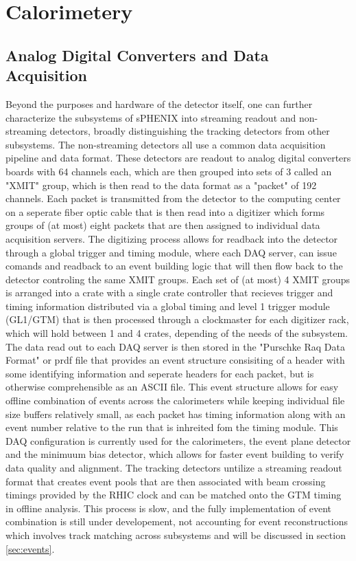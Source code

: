 \documentclass[letterpaper, 12pt, oneside]{book}
\theoremstyle{definition}
\begin{document}
\section{Calorimetery}
	\subsection{Analog Digital Converters and Data Acquisition}
		Beyond the purposes and hardware of the detector itself, one can further characterize the subsystems of sPHENIX into streaming readout and non-streaming detectors, broadly distinguishing the tracking detectors from other subsystems. 
		The non-streaming detectors all use a common data acquisition pipeline and data format. 
		These detectors are readout to analog digital converters boards with 64 channels each, which are then grouped into sets of 3 called an "XMIT" group, which is then read to the data format as a "packet" of 192 channels. 
		Each packet is transmitted from the detector to the computing center on a seperate fiber optic cable that is then read into a digitizer which forms groups of (at most) eight packets that are then assigned to individual data acquisition servers. 
		The digitizing process allows for readback into the detector through a global trigger and timing module, where each DAQ server, can issue comands and readback to an event building logic that will then flow back to the detector controling the same XMIT groups. 
		Each set of (at most) 4 XMIT groups is arranged into a crate with a single crate controller that recieves trigger and timing information distributed via a global timing and level 1 trigger module (GL1/GTM) that is then processed through a clockmaster for each digitizer rack, which will hold between 1 and 4 crates, depending of the needs of the subsystem. 
		The data read out to each DAQ server is then stored in the "Purschke Raq Data Format" or prdf file that provides an event structure consisiting of a header with some identifying information and seperate headers for each packet, but is otherwise comprehensible as an ASCII file. 
		This event structure allows for easy offline combination of events across the calorimeters while keeping individual file size buffers relatively small, as each packet has timing information along with an event number relative to the run that is inhreited fom the timing module. 
		This DAQ configuration is currently used for the calorimeters, the event plane detector and the minimuum bias detector, which allows for faster event building to verify data quality and alignment. 
		The tracking detectors untilize a streaming readout format that creates event pools that are then associated with beam crossing timings provided by the RHIC clock and can be matched onto the GTM timing in offline analysis. 
		This process is slow, and the fully implementation of event combination is still under developement, not accounting for event reconstructions which involves track matching across subsystems and will be discussed in section \ref{sec:events}.
\end{document}

